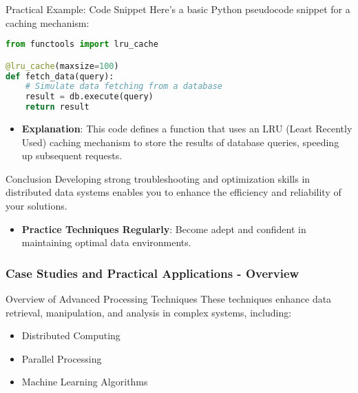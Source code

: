 \documentclass[aspectratio=169]{beamer}
\begin{document}
\begin{frame}[fragile]{Practical Example: Code Snippet}
    Here’s a basic Python pseudocode snippet for a caching mechanism:
    \begin{lstlisting}[language=Python]
from functools import lru_cache

@lru_cache(maxsize=100)
def fetch_data(query):
    # Simulate data fetching from a database
    result = db.execute(query)
    return result
    \end{lstlisting}
    \begin{itemize}
        \item \textbf{Explanation}: This code defines a function that uses an LRU (Least Recently Used) caching mechanism to store 
        the results of database queries, speeding up subsequent requests.
    \end{itemize}
\end{frame}

\begin{frame}{Conclusion}
    Developing strong troubleshooting and optimization skills in distributed data systems enables you to enhance the efficiency and reliability of your solutions. 
    \begin{itemize}
        \item \textbf{Practice Techniques Regularly}: Become adept and confident in maintaining optimal data environments.
    \end{itemize}
\end{frame}

\begin{frame}[fragile]
    \frametitle{Case Studies and Practical Applications - Overview}
    \begin{block}{Overview of Advanced Processing Techniques}
        These techniques enhance data retrieval, manipulation, and analysis in complex systems, including:
        \begin{itemize}
            \item Distributed Computing
            \item Parallel Processing
            \item Machine Learning Algorithms
        \end{itemize}
    \end{block}
\end{frame}
\end{document}
